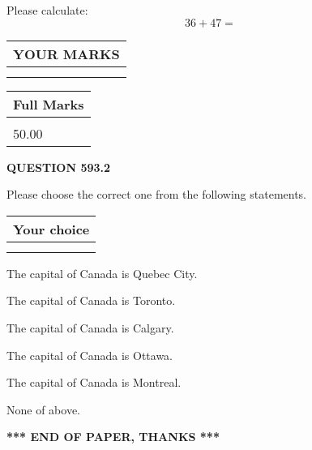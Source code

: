 \documentclass[12pt]{article}
\begin{document}
  
 
Please calculate:
\begin{equation}
36 +  %
47 = \nonumber
\end{equation}
 

 

 
  
\vspace{0.2in}
  
\noindent\begin{tabular}{|l|}
\hline
 YOUR MARKS  \\
\hline
 \\ 
 \\ 
\hline
\end{tabular}
\hspace{0.05in} \begin{tabular}{|l|}
\hline
 Full Marks  \\
\hline
 \\ 
50.00 \\
\hline
\end{tabular}
{\textbf{\Large{QUESTION
593.2 
}}}
  
  
Please choose the correct one from the following statements.
  
  
\noindent\hspace{3.0in} \begin{tabular}{|l|}
\hline
Your choice \\
\hline
 \\ 
 \\ 
\hline
\end{tabular}
  
  
 
 
The capital of Canada is Quebec City.
 
 
The capital of Canada is Toronto.
 
 
The capital of Canada is Calgary.
 
 
The capital of Canada is Ottawa.
 
 
The capital of Canada is Montreal.
 
 
 None of above.
 
 
   
   
 \vspace{0.2in}
 
   
   
   
   
\vspace{1.0in} 
{\textbf{\large{ *** END OF PAPER, THANKS *** }}} 
   
\end{document}
